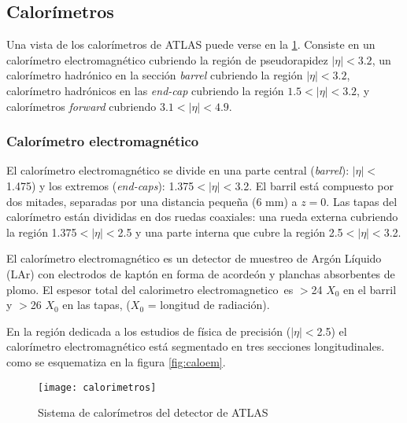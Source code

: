 \subsection{Calorímetros}

Una vista de los calorímetros de ATLAS puede verse en la \cref{fig:calorimetros}.
Consiste en un calorímetro electromagnético cubriendo la región de pseudorapidez
$|\eta| < 3.2$, un calorímetro hadrónico en la sección \emph{barrel} cubriendo
la región $|\eta| < 3.2$, calorímetro hadrónicos en las \emph{end-cap} cubriendo
la región $1.5 < |\eta| < 3.2$, y calorímetros \emph{forward} cubriendo $3.1 <
|\eta| < 4.9$.



\subsubsection{Calorímetro electromagnético}
El calorímetro electromagnético \cite{caloemTDR} se divide en una parte central
(\emph{barrel}): $|\eta|<$1.475) y los extremos (\emph{end-caps}):
1.375$<|\eta|<$3.2. El barril está compuesto por dos mitades, separadas por una
distancia pequeña (6 mm) a $z = 0$. Las tapas del calorímetro están divididas en
dos ruedas coaxiales: una rueda externa cubriendo la región 1.375$<|\eta|<$2.5 y
una parte interna que cubre la región 2.5$<|\eta|<$3.2.

El calorímetro electromagnético es un detector de muestreo de Argón Líquido
(LAr) con electrodos de kaptón en forma de acordeón y planchas absorbentes de
plomo. El espesor total del calorimetro electromagnetico\ es $>$24 $X_0$ en el
barril y $>$26 $X_0$ en las tapas, ($X_0$ = longitud de radiación).

En la región dedicada a los estudios de física de precisión ($|\eta|<$2.5) el
calorímetro electromagnético está segmentado en tres secciones longitudinales.%
como se esquematiza en la figura \ref{fig:caloem}.

\begin{figure}[!htbp]
  \centering

  \texttt{[image: calorimetros]}

  \caption{Sistema de calorímetros del detector de ATLAS}
  \label{fig:calorimetros}

\end{figure}


